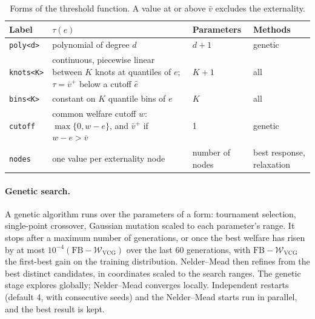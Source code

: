 \documentclass[11pt]{article}
\newcommand{\vplus}{\bar v^{+}}
\newcommand{\W}{\mathcal{W}}
\newcommand{\code}[1]{\texttt{#1}}
\begin{document}
\begin{table}[ht]
\centering\small
\begin{tabularx}{\linewidth}{@{}l L l l@{}}
\toprule
Label & $\tau(e)$ & Parameters & Methods \\
\midrule
\code{poly<d>} & polynomial of degree $d$ & $d+1$ & genetic \\
\code{knots<K>} & continuous, piecewise linear between $K$ knots at quantiles of $e$; $\tau=\vplus$ below a cutoff $\hat e$ & $K+1$ & all \\
\code{bins<K>} & constant on $K$ quantile bins of $e$ & $K$ & all \\
\code{cutoff} & common welfare cutoff $w$: $\max\{0,w-e\}$, and $\vplus$ if $w-e>\bar v$ & 1 & genetic \\
\code{nodes} & one value per externality node & number of nodes & best response, relaxation \\
\bottomrule
\end{tabularx}
\caption{Forms of the threshold function. A value at or above $\bar v$ excludes the externality.}
\label{tab:forms}
\end{table}

\paragraph{Genetic search.} A genetic algorithm runs over the parameters of a form: tournament selection, single-point crossover, Gaussian mutation scaled to each parameter's range. It stops after a maximum number of generations, or once the best welfare has risen by at most $10^{-4}(\mathrm{FB}-\W_{\mathrm{VCG}})$ over the last 60 generations, with $\mathrm{FB}-\W_{\mathrm{VCG}}$ the first-best gain on the training distribution. Nelder--Mead then refines from the best distinct candidates, in coordinates scaled to the search ranges. The genetic stage explores globally; Nelder--Mead converges locally. Independent restarts (default 4, with consecutive seeds) and the Nelder--Mead starts run in parallel, and the best result is kept.
\end{document}
